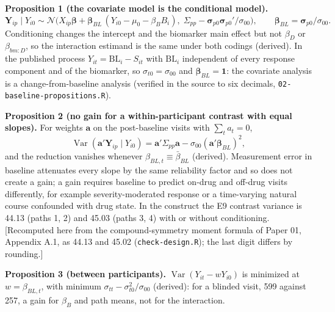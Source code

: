 \documentclass[11pt]{article}
\newcommand{\note}[1]{\textcolor{blue!60!black}{\small [#1]}}
\newcommand{\code}[1]{\texttt{#1}}
\begin{document}
\textbf{Proposition 1 (the covariate model is the conditional model).}
\begin{equation}
\mathbf{Y}_{ip} \mid Y_{i0} \sim \mathcal N\!\Big(X_{ip}\boldsymbol\beta
  + \boldsymbol\beta_{BL}\,(Y_{i0} - \mu_0 - \beta_B B_i),\;
  \Sigma_{pp} - \boldsymbol\sigma_{p0}\boldsymbol\sigma_{p0}'/\sigma_{00}
  \Big), \qquad \boldsymbol\beta_{BL} = \boldsymbol\sigma_{p0}/\sigma_{00}.
\label{eq:bp-prop1}
\end{equation}
Conditioning changes the intercept and the biomarker main effect but
not $\beta_D$ or $\beta_{bm:D}$, so the interaction estimand is the
same under both codings (derived). In the published process
$Y_{it} = \mathrm{BL}_i - S_{it}$ with $\mathrm{BL}_i$ independent of
every response component and of the biomarker, so
$\sigma_{t0} = \sigma_{00}$ and $\boldsymbol\beta_{BL} = \mathbf 1$: the
covariate analysis is a change-from-baseline analysis (verified in the
source to six decimals, \code{02-baseline-propositions.R}).

\textbf{Proposition 2 (no gain for a within-participant contrast with
equal slopes).} For weights $\mathbf a$ on the post-baseline visits
with $\sum_t a_t = 0$,
\begin{equation}
\operatorname{Var}(\mathbf a'\mathbf Y_{ip} \mid Y_{i0})
  = \mathbf a'\Sigma_{pp}\mathbf a - \sigma_{00}(\mathbf a'\boldsymbol\beta_{BL})^2 ,
\label{eq:bp-prop2}
\end{equation}
and the reduction vanishes whenever $\beta_{BL,t} \equiv \bar\beta_{BL}$ (derived).
Measurement error in baseline attenuates every slope by the same
reliability factor and so does not create a gain; a gain requires
baseline to predict on-drug and off-drug visits differently, for
example severity-moderated response or a time-varying natural course
confounded with drug state. In the construct the E9 contrast variance
is 44.13 (paths 1, 2) and 45.03 (paths 3, 4) with or without
conditioning. \note{Recomputed here from the compound-symmetry moment
formula of Paper 01, Appendix A.1, as 44.13 and 45.02
(\code{check-design.R}); the last digit differs by rounding.}

\textbf{Proposition 3 (between participants).}
$\operatorname{Var}(Y_{it} - wY_{i0})$ is minimized at $w = \beta_{BL,t}$,
with minimum $\sigma_{tt} - \sigma_{t0}^2/\sigma_{00}$ (derived): for a
blinded visit, 599 against 257, a gain for $\beta_B$ and path means,
not for the interaction.
\end{document}
